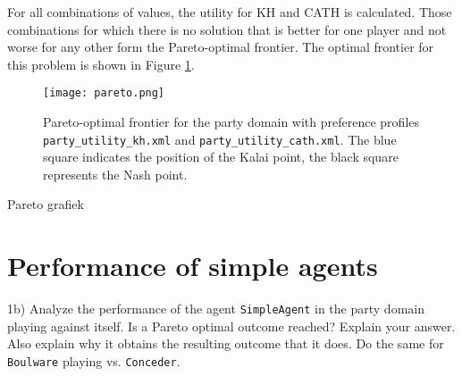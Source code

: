 For all combinations of values, the utility for KH and CATH is calculated.
Those combinations for which there is no solution that is better for one player and not worse for any other form the Pareto-optimal frontier.
The optimal frontier for this problem is shown in Figure \ref{fig:pareto}.
\begin{figure}
\centering
\texttt{[image: pareto.png]}
\caption{Pareto-optimal frontier for the party domain with preference profiles \texttt{party\_utility\_kh.xml} and \texttt{party\_utility\_cath.xml}. The blue square indicates the position of the Kalai point, the black square represents the Nash point.}
\label{fig:pareto}
\end{figure}


Pareto grafiek

\section{Performance of simple agents}

1b) Analyze the performance of the agent \texttt{SimpleAgent} in the party domain playing against itself. Is a Pareto optimal outcome reached? Explain your answer. Also explain why it obtains the resulting outcome that it does. Do the same for \texttt{Boulware} playing vs. \texttt{Conceder}.